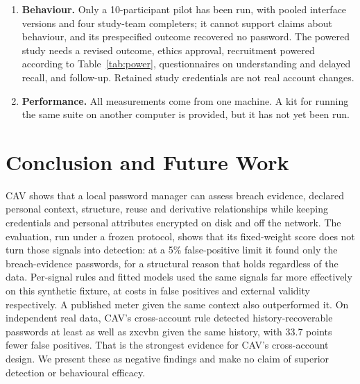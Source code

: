 \documentclass[conference]{IEEEtran}
\begin{document}
\begin{enumerate}
\item \textbf{Behaviour.} Only a 10-participant pilot has been run, with pooled interface versions and four study-team completers; it cannot support claims about behaviour, and its prespecified outcome recovered no password. The powered study needs a revised outcome, ethics approval, recruitment powered according to Table~\ref{tab:power}, questionnaires on understanding and delayed recall, and follow-up. Retained study credentials are not real account changes.
\item \textbf{Performance.} All measurements come from one machine. A kit for running the same suite on another computer is provided, but it has not yet been run.
\end{enumerate}

\section{Conclusion and Future Work}
CAV shows that a local password manager can assess breach evidence, declared personal context, structure, reuse and derivative relationships while keeping credentials and personal attributes encrypted on disk and off the network. The evaluation, run under a frozen protocol, shows that its fixed-weight score does not turn those signals into detection: at a 5\% false-positive limit it found only the breach-evidence passwords, for a structural reason that holds regardless of the data. Per-signal rules and fitted models used the same signals far more effectively on this synthetic fixture, at costs in false positives and external validity respectively. A published meter given the same context also outperformed it. On independent real data, CAV's cross-account rule detected history-recoverable passwords at least as well as zxcvbn given the same history, with 33.7 points fewer false positives. That is the strongest evidence for CAV's cross-account design. We present these as negative findings and make no claim of superior detection or behavioural efficacy.
\end{document}
